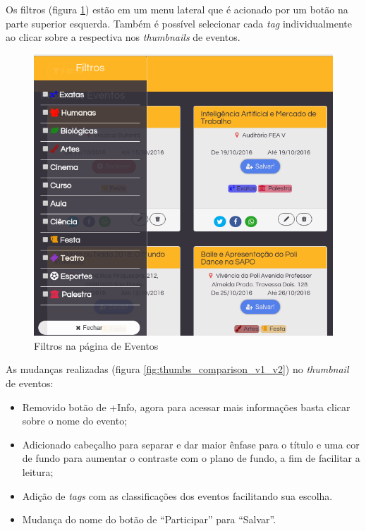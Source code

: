 \par Os filtros (figura \ref{fig:events_pagev2_filters}) estão em um menu lateral que é acionado por um botão na parte superior esquerda. Também é possível selecionar cada \emph{tag} individualmente ao clicar sobre a respectiva nos \emph{thumbnails} de eventos.
        \begin{figure}[htb]
        \centering
		\includegraphics[width=15cm]{figuras/events_pagev2_filters}
		\caption{\label{fig:events_pagev2_filters} Filtros na página de Eventos}
		\end{figure}
\par As mudanças realizadas (figura \ref{fig:thumbs_comparison_v1_v2}) no \emph{thumbnail} de eventos:
\begin{itemize}
\item Removido botão de +Info, agora para acessar mais informações basta clicar sobre o nome do evento;
\item Adicionado cabeçalho para separar e dar maior ênfase para o título e uma cor de fundo para aumentar o contraste com o plano de fundo, a fim de facilitar a leitura;
\item Adição de \emph{tags} com as classificações dos eventos facilitando sua escolha.
\item Mudança do nome do botão de ``Participar'' para ``Salvar''.
\end{itemize}
